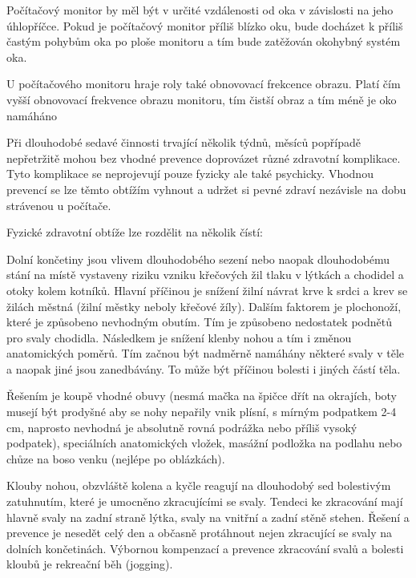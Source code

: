 
Počítačový monitor by měl být v určité vzdálenosti od oka v závislosti na jeho úhlopříčce. Pokud je počítačový monitor příliš blízko oku, bude docházet k příliš častým pohybům oka po ploše monitoru a tím bude zatěžován okohybný systém oka. 

U počítačového monitoru hraje roly také obnovovací frekcence obrazu. Platí čím vyšší obnovovací frekvence obrazu monitoru, tím čistší obraz a tím méně je oko namáháno


Při dlouhodobé sedavé činnosti trvající několik týdnů, měsíců popřípadě nepřetržitě mohou bez vhodné prevence doprovázet různé zdravotní komplikace. Tyto komplikace se neprojevují pouze fyzicky ale také psychicky. Vhodnou prevencí se lze těmto obtížím vyhnout a udržet si pevné zdraví nezávisle na dobu strávenou u počítače. 

Fyzické zdravotní obtíže lze rozdělit na několik čístí:

\vskip 4mm
\vskip 4mm


Dolní končetiny jsou vlivem dlouhodobého sezení nebo naopak dlouhodobému stání na místě vystaveny riziku vzniku křečových žil tlaku v lýtkách a chodidel a otoky kolem kotníků. Hlavní příčinou je snížení žilní návrat krve k srdci a krev se žilách městná (žilní městky neboly křečové žíly). Dalším faktorem je plochonoží, které je způsobeno nevhodným obutím. Tím je způsobeno nedostatek podnětů pro svaly chodidla. Následkem je snížení klenby nohou a tím i změnou anatomických poměrů. Tím začnou být nadměrně namáhány některé svaly v těle a naopak jiné jsou zanedbávány. To může být příčinou bolesti i jiných částí těla.

Řešením je koupě vhodné obuvy (nesmá mačka na špičce dřít na okrajích, boty musejí být prodyšné aby se nohy nepařily vnik plísní, s mírným podpatkem 2-4 cm, naprosto nevhodná je absolutně rovná podrážka nebo příliš vysoký podpatek), speciálních anatomických vložek, masážní podložka na podlahu nebo chůze na boso venku (nejlépe po oblázkách).


Klouby nohou, obzvláště kolena a kyčle reagují na dlouhodobý sed bolestivým zatuhnutím, které je umocněno zkracujícími se svaly. Tendeci ke zkracování mají hlavně svaly na zadní straně lýtka, svaly na vnitřní a zadní stěně stehen. Řešení a prevence je nesedět celý den a občasně protáhnout nejen zkracující se svaly na dolních končetinách. Výbornou kompenzací a prevence zkracování svalů a bolesti kloubů je rekreační běh (jogging).

